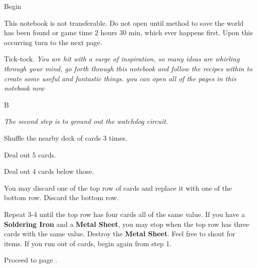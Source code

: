 \documentclass[GreenNotebook]{guildcamp3} %
\begin{document}
\startnotebook{\nSciOneRecipes{}}



\begin{page}{Begin}
	
	This notebook is not transferable. Do not open until method to save the world has been found or game time 2 hours 30 min, which ever happens first. Upon this occurring turn to the next page.
\end{page}



\begin{page}{Tick-tock.}
	{\it You are hit with a surge of inspiration, so many ideas are whirling through your mind, go forth through this notebook and follow the recipes within to create some useful and fantastic things. you can open all of the pages in this notebook now}
	
	
	
\end{page}



\begin{page}{B}
	
	{\it The second step is to ground out the watchdog circuit.}
	
	\begin{enum}
		\item Shuffle the nearby deck of cards 3 times. 
		\item Deal out 5 cards.
		\item Deal out 4 cards below those.
		\item You may discard one of the top row of cards and replace it with one of the bottom row. Discard the bottom row.
		\item Repeat 3-4 until the top row has four cards all of the same value. If you have a {\bf Soldering Iron} and a {\bf Metal Sheet}, you may stop when the top row has three cards with the same value. Destroy the {\bf Metal Sheet}. Feel free to shout for items. If you run out of cards, begin again from step 1. 
		\item Proceed to page .
	\end{enum}
	
\end{page}
\end{document}
